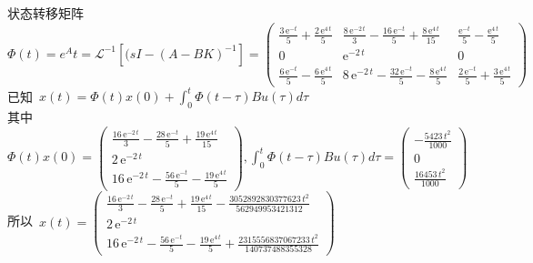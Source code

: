 \documentclass[a4paper]{article}
\begin{document}
\mbox{状态转移矩阵 }$ \Phi(t)=e^At=\mathcal{L}^{-1}[(sI-(A-BK)^{-1}]=\left(\begin{array}{ccc} \frac{3\, \mathrm{e}^{- t}}{5} + \frac{2\, \mathrm{e}^{4\, t}}{5} & \frac{8\, \mathrm{e}^{- 2\, t}}{3} - \frac{16\, \mathrm{e}^{- t}}{5} + \frac{8\, \mathrm{e}^{4\, t}}{15} & \frac{\mathrm{e}^{- t}}{5} - \frac{\mathrm{e}^{4\, t}}{5}\\ 0 & \mathrm{e}^{- 2\, t} & 0\\ \frac{6\, \mathrm{e}^{- t}}{5} - \frac{6\, \mathrm{e}^{4\, t}}{5} & 8\, \mathrm{e}^{- 2\, t} - \frac{32\, \mathrm{e}^{- t}}{5} - \frac{8\, \mathrm{e}^{4\, t}}{5} & \frac{2\, \mathrm{e}^{- t}}{5} + \frac{3\, \mathrm{e}^{4\, t}}{5} \end{array}\right)$ \\
\mbox{已知 }$x(t)=\Phi(t)x(0)+\int_{0}^{t}\Phi(t-\tau)Bu(\tau)d\tau $ \\
\mbox{其中 }$\Phi(t)x(0)=\left(\begin{array}{c} \frac{16\, \mathrm{e}^{- 2\, t}}{3} - \frac{28\, \mathrm{e}^{- t}}{5} + \frac{19\, \mathrm{e}^{4\, t}}{15}\\ 2\, \mathrm{e}^{- 2\, t}\\ 16\, \mathrm{e}^{- 2\, t} - \frac{56\, \mathrm{e}^{- t}}{5} - \frac{19\, \mathrm{e}^{4\, t}}{5} \end{array}\right), \int_{0}^{t}\Phi(t-\tau)Bu(\tau)d\tau= \left(\begin{array}{c} -\frac{5423\, t^2}{1000}\\ 0\\ \frac{16453\, t^2}{1000} \end{array}\right)$ \\
\mbox{所以 }$x(t)=\left(\begin{array}{c} \frac{16\, \mathrm{e}^{- 2\, t}}{3} - \frac{28\, \mathrm{e}^{- t}}{5} + \frac{19\, \mathrm{e}^{4\, t}}{15} - \frac{3052892830377623\, t^2}{562949953421312}\\ 2\, \mathrm{e}^{- 2\, t}\\ 16\, \mathrm{e}^{- 2\, t} - \frac{56\, \mathrm{e}^{- t}}{5} - \frac{19\, \mathrm{e}^{4\, t}}{5} + \frac{2315556837067233\, t^2}{140737488355328} \end{array}\right)$
\end{document}
